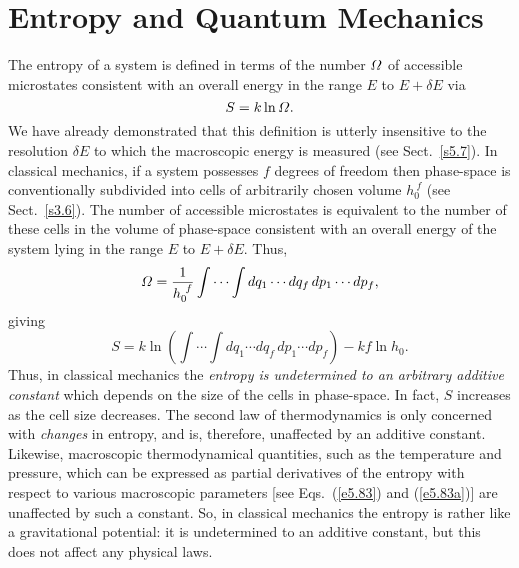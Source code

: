 \section{Entropy and Quantum Mechanics}\label{s5.9}
The entropy of a system is defined in terms of the number
${\mit\Omega}$  of accessible microstates
consistent with an overall energy in the range $E$ to $E+\delta E$ via
\begin{equation}
S = k\ln {\mit\Omega}.
\end{equation}
We have already demonstrated that this definition is utterly insensitive to the
resolution $\delta E$ to which the macroscopic energy is measured 
(see Sect.~\ref{s5.7}).
In classical mechanics, if a system possesses $f$ degrees of freedom then 
phase-space is conventionally 
subdivided into cells of arbitrarily chosen volume $h_0^{~f}$ (see
Sect.~\ref{s3.6}). The number of accessible microstates is equivalent to the number
of these cells in the volume of phase-space consistent with an overall energy of
the system lying in the range $E$ to $E+\delta E$. Thus,
\begin{equation}
{\mit\Omega} = \frac{1}{h_0^{~f}} \int \cdots \int dq_1\cdots dq_f\,dp_1\cdots dp_f,
\end{equation}
giving
\begin{equation}
S = k \ln\left( \int \cdots \int dq_1\cdots dq_f\,dp_1\cdots dp_f\right) -
kf\ln h_0.\label{e5.89}
\end{equation}
Thus, in classical mechanics the {\em entropy is undetermined to an arbitrary
additive constant}\/ which depends on the size of the cells in phase-space.
In fact, $S$ increases as the cell size decreases.
The second law of thermodynamics is only concerned with {\em changes}\/ in entropy,
and is, therefore, unaffected by an additive constant. Likewise, macroscopic
thermodynamical quantities, such as the temperature and pressure, which can
be expressed as partial derivatives of the entropy with respect to various
macroscopic parameters [see Eqs.~(\ref{e5.83}) and (\ref{e5.83a})] are unaffected by such a constant. 
So, in classical mechanics the entropy is rather like a gravitational  potential:
it is undetermined to an additive constant, but this does not affect any 
physical laws.

